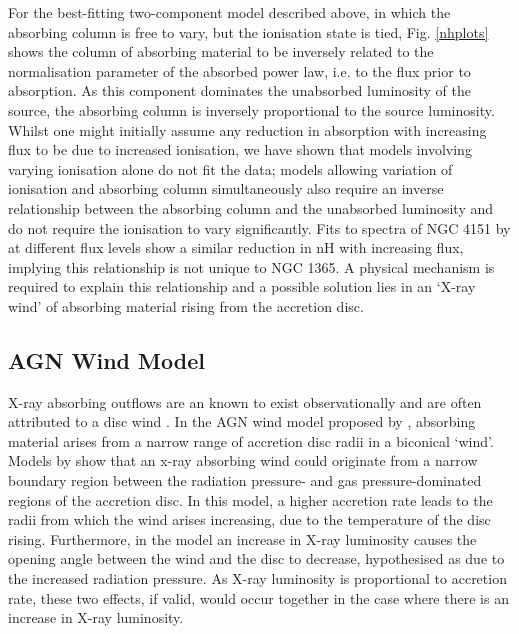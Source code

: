 \documentclass[useAMS,usenatbib]{sam}
\begin{document}
For the best-fitting two-component model described above, in which the absorbing column is free to vary, but the ionisation state is tied, Fig. \ref{nhplots} shows the
column of absorbing material to be inversely related to the normalisation parameter of the absorbed power law, i.e. to the flux prior to absorption. As this component
dominates the unabsorbed luminosity of the source, the absorbing column is inversely proportional to the source luminosity. Whilst one might initially assume any
reduction in absorption with increasing flux to be due to increased ionisation, we have shown that models involving varying ionisation alone do not fit the data; models
allowing variation of ionisation and absorbing column simultaneously also require an inverse relationship between the absorbing column and the unabsorbed luminosity and
do not require the ionisation to vary significantly. Fits to spectra of NGC 4151 by \citet{lubinski10} at different flux levels show a similar reduction in nH with
increasing flux, implying this relationship is not unique to NGC 1365. A physical mechanism is required to explain this relationship and a possible solution lies in an
`X-ray wind’ of absorbing material rising from the accretion disc.

\subsection{AGN Wind Model}

X-ray absorbing outflows are an known to exist observationally and are often attributed to a disc wind \citep{tombesi}. In the AGN wind model proposed by \citet{elvis},
absorbing material arises from a narrow range of accretion disc radii in a biconical `wind'. Models by \citet{nicastro} show that an x-ray absorbing wind could originate
from a narrow boundary region between the radiation pressure- and gas pressure-dominated regions of the accretion disc. In this model, a higher accretion rate leads to
the radii from which the wind arises increasing, due to the temperature of the disc rising. Furthermore, in the \citet{elvis} model an increase in X-ray luminosity causes
the opening angle between the wind and the disc to decrease, hypothesised as due to the increased radiation pressure. As X-ray luminosity is proportional to accretion
rate, these two effects, if valid, would occur together in the case where there is an increase in X-ray luminosity.
\end{document}
